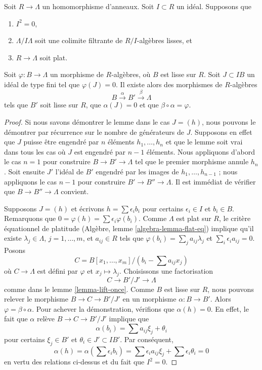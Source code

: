 \begin{lemma}
\label{lemma-lift-twice}
Soit $R \to \Lambda$ un homomorphisme d'anneaux. Soit $I \subset R$ un idéal.
Supposons que
\begin{enumerate}
\item $I^2 = 0$,
\item $\Lambda/I\Lambda$ soit une colimite filtrante de $R/I$-algèbres lisses, et
\item $R \to \Lambda$ soit plat.
\end{enumerate}
Soit $\varphi : B \to \Lambda$ un morphisme de $R$-algèbres, où $B$
est lisse sur $R$. Soit $J \subset IB$ un idéal de type fini
tel que $\varphi(J) = 0$.
Il existe alors des morphismes de $R$-algèbres
$$
B \xrightarrow{\alpha} B' \xrightarrow{\beta} \Lambda
$$
tels que $B'$ soit lisse sur $R$, que $\alpha(J) = 0$ et
que $\beta \circ \alpha = \varphi$.
\end{lemma}

\begin{proof}
Si nous savons démontrer le lemme dans le cas $J = (h)$, nous pouvons le
démontrer par récurrence sur le nombre de générateurs de $J$. Supposons en effet
que $J$ puisse être engendré par $n$ éléments $h_1, \ldots, h_n$ et que le
lemme soit vrai dans tous les cas où $J$ est engendré par $n - 1$ éléments.
Nous appliquons d'abord le cas $n = 1$ pour construire $B \to B' \to \Lambda$
tel que le premier morphisme annule $h_n$. Soit ensuite $J'$ l'idéal de $B'$
engendré par les images de $h_1, \ldots, h_{n - 1}$ ; nous appliquons le cas
$n - 1$ pour construire $B' \to B'' \to \Lambda$.
Il est immédiat de vérifier que $B \to B'' \to \Lambda$ convient.

\medskip\noindent
Supposons $J = (h)$ et écrivons $h = \sum \epsilon_i b_i$
pour certains $\epsilon_i \in I$ et $b_i \in B$. Remarquons que
$0 = \varphi(h) = \sum \epsilon_i \varphi(b_i)$.
Comme $\Lambda$ est plat sur $R$, le critère équationnel de platitude
(Algèbre, lemme \ref{algebra-lemma-flat-eq}) implique qu'il existe
$\lambda_j \in \Lambda$, $j = 1, \ldots, m$, et $a_{ij} \in R$ tels que
$\varphi(b_i) = \sum_j a_{ij} \lambda_j$ et $\sum_i \epsilon_i a_{ij} = 0$.
Posons
$$
C = B[x_1, \ldots, x_m]/(b_i - \sum a_{ij} x_j)
$$
où $C \to \Lambda$ est défini par $\varphi$ et $x_j \mapsto \lambda_j$.
Choisissons une factorisation
$$
C \to B'/J' \to \Lambda
$$
comme dans le lemme \ref{lemma-lift-once}. Comme $B$ est lisse sur $R$, nous pouvons
relever le morphisme $B \to C \to B'/J'$ en un morphisme $\alpha : B \to B'$. Alors
$\varphi = \beta \circ \alpha$. Pour achever la démonstration, vérifions que
$\alpha(h) = 0$. En effet, le fait que $\alpha$ relève
$B \to C \to B'/J'$ implique que
$$
\alpha(b_i) = \sum a_{ij} \xi_j + \theta_i
$$
pour certains $\xi_j \in B'$ et $\theta_i \in J' \subset IB'$.
Par conséquent,
$$
\alpha(h) = \alpha(\sum \epsilon_i b_i) =
\sum \epsilon_i a_{ij} \xi_j + \sum \epsilon_i \theta_i = 0
$$
en vertu des relations ci-dessus et du fait que $I^2 = 0$.
\end{proof}

